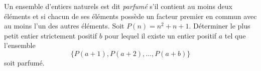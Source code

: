 Un ensemble d'entiers naturels est dit \emph{parfumé} s'il contient au moins deux éléments et si chacun de ses
éléments possède un facteur premier en commun avec au moins l'un des autres éléments. Soit
$P(n) = n^2 + n + 1$. Déterminer le plus petit entier strictement positif $b$ pour lequel il existe un entier
positif $a$ tel que l'ensemble
\[
\{P(a+1), P(a+2), \ldots, P(a+b)\}
\]
soit parfumé.
